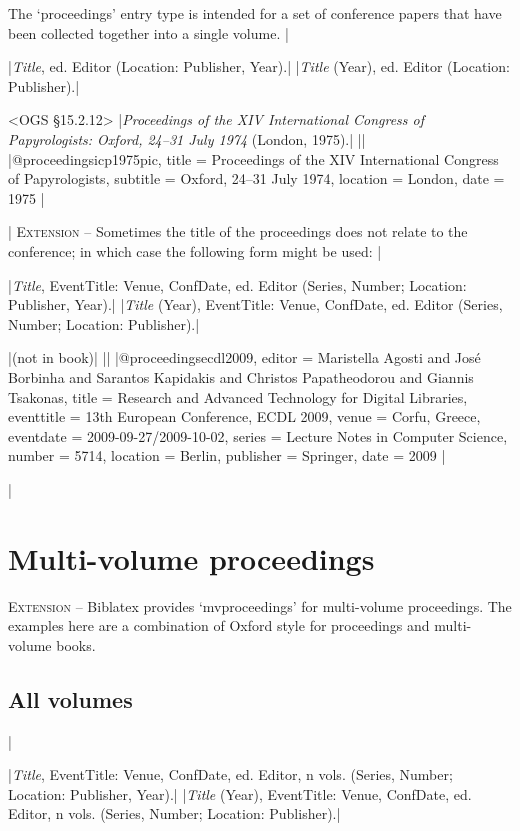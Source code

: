 \documentclass[extrafontsizes,11pt,a4paper,oneside]{memoir}
\newcommand*{\lit}[1]{\textsf{#1}}
\newcommand*{\code}[1]{`\textsf{#1}'}
\begin{document}
The \code{proceedings} entry type is intended for a set of conference papers that have been collected together into a single volume.
|

\specs
|\emph{Title}, \lit{ed.} Editor (Location: Publisher, Year).|%
|\emph{Title} (Year), \lit{ed.} Editor (Location: Publisher).|

\bibexample<OGS \S15.2.12>
|\emph{Proceedings of the XIV International Congress of Papyrologists: Oxford, 24--31 July 1974} (London, 1975).|%
||%
|@proceedings{icp1975pic,
  title = {Proceedings of the {XIV} {International} {Congress} of {Papyrologists}},
  subtitle = {{Oxford}, 24--31 {July} 1974},
  location = {London},
  date = {1975}
}|

\todoc|
\textsc{Extension} – Sometimes the title of the proceedings does not relate to the conference; in which case the following form might be used:
|

\specs
|\emph{Title}, EventTitle: Venue, ConfDate, \lit{ed.} Editor (Series, Number; Location: Publisher, Year).|%
|\emph{Title} (Year), EventTitle: Venue, ConfDate, \lit{ed.} Editor (Series, Number; Location: Publisher).|

\bibexample
|(not in book)|%
||%
|@proceedings{ecdl2009,
  editor = {Maristella Agosti and José Borbinha and Sarantos Kapidakis and Christos Papatheodorou and Giannis Tsakonas},
  title = {Research and Advanced Technology for Digital Libraries},
  eventtitle = {13th European Conference, ECDL 2009},
  venue = {Corfu, Greece},
  eventdate = {2009-09-27/2009-10-02},
  series = {Lecture Notes in Computer Science},
  number = {5714},
  location = {Berlin},
  publisher = {Springer},
  date = {2009}
}|

\todoc|
\section{Multi-volume proceedings}

\textsc{Extension} – Biblatex provides \code{mvproceedings} for multi-volume proceedings.
The examples here are a combination of Oxford style for proceedings and multi-volume books.

\subsection{All volumes}
|

\specs
|\emph{Title}, EventTitle: Venue, ConfDate, \lit{ed.} Editor, n \lit{vols.} (Series, Number; Location: Publisher, Year).|%
|\emph{Title} (Year), EventTitle: Venue, ConfDate, \lit{ed.} Editor, n \lit{vols.} (Series, Number; Location: Publisher).|
\end{document}

